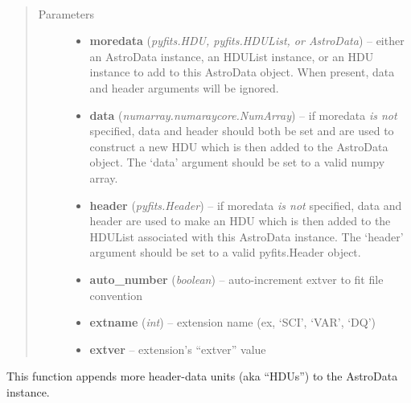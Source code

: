 \documentclass[letterpaper,10pt,english]{sphinxmanual}
\begin{document}
\begin{fulllineitems}
\label{chapter_AstroDataClass:astrodata.data.AstroData.append}~\begin{quote}\begin{description}
\item[{Parameters}] \leavevmode\begin{itemize}
\item {} 
\textbf{moredata} (\emph{pyfits.HDU, pyfits.HDUList, or AstroData}) -- either an AstroData instance, an HDUList instance, 
or an HDU instance to add to this AstroData object.
When present, data and header arguments will be ignored.

\item {} 
\textbf{data} (\emph{numarray.numaraycore.NumArray}) -- if moredata \emph{is not} specified, data and header should 
both be set and are used to construct a new HDU which is then 
added to the  AstroData object. The `data' argument should be set
to a valid numpy array.

\item {} 
\textbf{header} (\emph{pyfits.Header}) -- if moredata \emph{is not} specified, data and header are used
to make  an HDU which is then added to the HDUList associated with
this AstroData instance. The `header' argument should be set to a
valid pyfits.Header object.

\item {} 
\textbf{auto\_number} (\emph{boolean}) -- auto-increment extver to fit file convention

\item {} 
\textbf{extname} (\emph{int}) -- extension name (ex, `SCI', `VAR', `DQ')

\item {} 
\textbf{extver} -- extension's ``extver'' value

\end{itemize}

\end{description}\end{quote}

This function appends more header-data units (aka ``HDUs'') to the AstroData
instance.

\end{fulllineitems}
\end{document}
